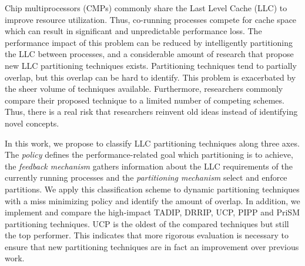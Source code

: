 Chip multiprocessors (CMPs) commonly share the Last Level Cache (LLC) to improve resource utilization.
Thus, co-running processes compete for cache space which can result in significant and unpredictable performance loss.
The performance impact of this problem can be reduced by intelligently partitioning the LLC between processes, and a considerable amount of research that propose new LLC partitioning techniques exists.
Partitioning techniques tend to partially overlap, but this overlap can be hard to identify.
This problem is exacerbated by the sheer volume of techniques available.
Furthermore, researchers commonly compare their proposed technique to a limited number of competing schemes.
Thus, there is a real risk that researchers reinvent old ideas instead of identifying novel concepts.

In this work, we propose to classify LLC partitioning techniques along three axes.
The \emph{policy} defines the performance-related goal which partitioning is to achieve, the \emph{feedback mechanism} gathers information about the LLC requirements of the currently running processes and the \emph{partitioning mechanism} select and enforce partitions.
We apply this classification scheme to dynamic partitioning techniques with a miss minimizing policy and identify the amount of overlap.
In addition, we implement and compare the high-impact TADIP, DRRIP, UCP, PIPP and PriSM partitioning techniques.
UCP is the oldest of the compared techniques but still the top performer.
This indicates that more rigorous evaluation is necessary to ensure that new partitioning techniques are in fact an improvement over previous work.